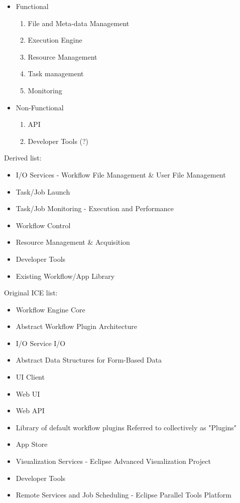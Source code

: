 \begin{itemize}
\item Functional
\begin{enumerate}
\item File and Meta-data Management
\item Execution Engine 
\item Resource Management
\item Task management
\item Monitoring
\end{enumerate}
\item Non-Functional
\begin{enumerate}
\item API 
\item Developer Tools (?)
\end{enumerate}
\end{itemize}

Derived list:


\begin{itemize}
\item I/O Services - Workflow File Management \& User File Management
\item Task/Job Launch
\item Task/Job Monitoring - Execution and Performance
\item Workflow Control
\item Resource Management \& Acquisition
\item Developer Tools
\item Existing Workflow/App Library
\end{itemize}

Original ICE list:
\begin{itemize}
\item Workflow Engine	Core
\item Abstract Workflow Plugin Architecture
\item I/O Service	I/O	
\item Abstract Data Structures for Form-Based Data
\item UI Client	
\item Web UI
\item Web API
\item Library of default workflow plugins	Referred to collectively as "Plugins"	
\item App Store
\item Visualization Services - Eclipse Advanced Visualization Project
\item Developer Tools
\item Remote Services and Job Scheduling - Eclipse Parallel Tools Platform
\end{itemize}